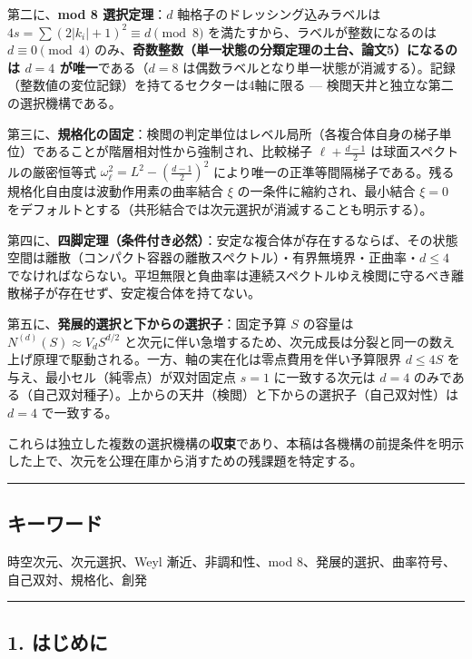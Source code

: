 \documentclass[
]{ltjsarticle}
\begin{document}
第二に、\textbf{mod 8 選択定理}：\(d\) 軸格子のドレッシング込みラベルは
\(4s=\sum(2|k_i|+1)^2\equiv d\pmod 8\)
を満たすから、ラベルが整数になるのは \(d\equiv0\pmod4\)
のみ、\textbf{奇数整数（単一状態の分類定理の土台、論文5）になるのは
\(d=4\) が唯一}である（\(d=8\)
は偶数ラベルとなり単一状態が消滅する）。記録（整数値の変位記録）を持てるセクターは4軸に限る
--- 検閲天井と独立な第二の選択機構である。

第三に、\textbf{規格化の固定}：検閲の判定単位はレベル局所（各複合体自身の梯子単位）であることが階層相対性から強制され、比較梯子
\(\ell+\tfrac{d-1}2\) は球面スペクトルの厳密恒等式
\(\omega_\ell^2=L^2-(\tfrac{d-1}2)^2\)
により唯一の正準等間隔梯子である。残る規格化自由度は波動作用素の曲率結合
\(\xi\) の一条件に縮約され、最小結合 \(\xi=0\)
をデフォルトとする（共形結合では次元選択が消滅することも明示する）。

第四に、\textbf{四脚定理（条件付き必然）}：安定な複合体が存在するならば、その状態空間は離散（コンパクト容器の離散スペクトル）・有界無境界・正曲率・\(d\le4\)
でなければならない。平坦無限と負曲率は連続スペクトルゆえ検閲に守るべき離散梯子が存在せず、安定複合体を持てない。

第五に、\textbf{発展的選択と下からの選択子}：固定予算 \(S\) の容量は
\(N^{(d)}(S)\approx V_d S^{d/2}\)
と次元に伴い急増するため、次元成長は分裂と同一の数え上げ原理で駆動される。一方、軸の実在化は零点費用を伴い予算限界
\(d\le4S\) を与え、最小セル（純零点）が双対固定点 \(s=1\)
に一致する次元は \(d=4\)
のみである（自己双対種子）。上からの天井（検閲）と下からの選択子（自己双対性）は
\(d=4\) で一致する。

これらは独立した複数の選択機構の\textbf{収束}であり、本稿は各機構の前提条件を明示した上で、次元を公理在庫から消すための残課題を特定する。

\begin{center}\rule{0.5\linewidth}{0.5pt}\end{center}

\subsection{キーワード}\label{ux30adux30fcux30efux30fcux30c9}

時空次元、次元選択、Weyl 漸近、非調和性、mod
8、発展的選択、曲率符号、自己双対、規格化、創発

\begin{center}\rule{0.5\linewidth}{0.5pt}\end{center}

\subsection{1. はじめに}\label{ux306fux3058ux3081ux306b}
\end{document}
